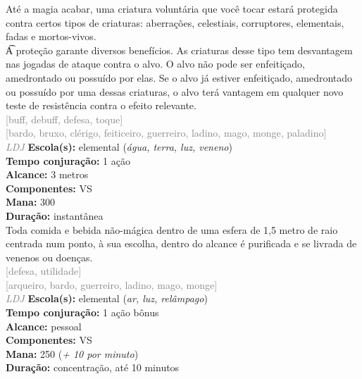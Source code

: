 \documentclass{RPG_Adventure}[2021/10/20]
\begin{document}
{\normalsize Até a magia acabar, uma criatura voluntária que você tocar estará protegida contra certos tipos de criaturas: aberrações, celestiais, corruptores, elementais, fadas e mortos-vivos.\\\t A proteção garante diversos benefícios. As criaturas desse tipo tem desvantagem nas jogadas de ataque contra o alvo. O alvo não pode ser enfeitiçado, amedrontado ou possuído por elas. Se o alvo já estiver enfeitiçado, amedrontado ou possuído por uma dessas criaturas, o alvo terá vantagem em qualquer novo teste de resistência contra o efeito relevante.\\}
{\scriptsize \textcolor{gray}{[buff, debuff, defesa, toque]\\}}
{\scriptsize \textcolor{gray}{[bardo, bruxo, clérigo, feiticeiro, guerreiro, ladino, mago, monge, paladino]\\}}
{\tiny \textcolor{gray}{\textit{LDJ}}}
{\small \t \textbf{Escola(s):} elemental (\textit{água, terra, luz, veneno})\\\t \textbf{Tempo conjuração:} 1 ação\\\t \textbf{Alcance:} 3 metros\\\t \textbf{Componentes:} VS\\\t \textbf{Mana:} 300\\\t \textbf{Duração:} instantânea\\}
{\normalsize Toda comida e bebida não-mágica dentro de uma esfera de 1,5 metro de raio centrada num ponto, à sua escolha, dentro do alcance é purificada e se livrada de venenos ou doenças.\\}
{\scriptsize \textcolor{gray}{[defesa, utilidade]\\}}
{\scriptsize \textcolor{gray}{[arqueiro, bardo, guerreiro, ladino, mago, monge]\\}}
{\tiny \textcolor{gray}{\textit{LDJ}}}
{\small \t \textbf{Escola(s):} elemental (\textit{ar, luz, relâmpago})\\\t \textbf{Tempo conjuração:} 1 ação bônus\\\t \textbf{Alcance:} pessoal\\\t \textbf{Componentes:} VS\\\t \textbf{Mana:} 250 (\textit{+ 10 por minuto})\\\t \textbf{Duração:} concentração, até 10 minutos\\}
\end{document}
